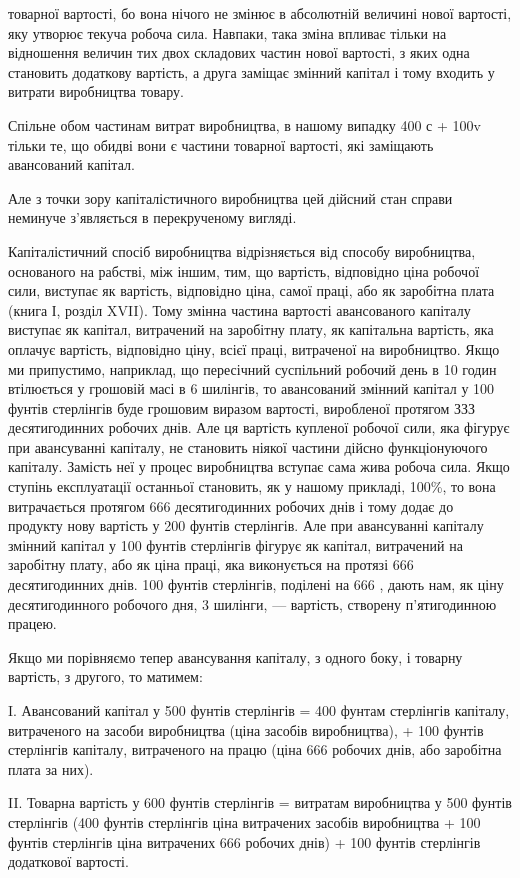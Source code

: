 \parcont{}  %
товарної вартості, бо вона нічого не змінює в абсолютній величині
нової вартості, яку утворює текуча робоча сила. Навпаки,
така зміна впливає тільки на відношення величин тих двох складових
частин нової вартості, з яких одна становить додаткову
вартість, а друга заміщає змінний капітал і тому входить у витрати
виробництва товару.

Спільне обом частинам витрат виробництва, в нашому випадку
400 с + 100v тільки те, що обидві вони є частини товарної
вартості, які заміщають авансований капітал.

Але з точки зору капіталістичного виробництва цей дійсний
стан справи неминуче з’являється в перекрученому вигляді.

Капіталістичний спосіб виробництва відрізняється від способу
виробництва, основаного на рабстві, між іншим, тим, що
вартість, відповідно ціна робочої сили, виступає як вартість,
відповідно ціна, самої праці, або як заробітна плата (книга І,
розділ XVII). Тому змінна частина вартості авансованого капіталу
виступає як капітал, витрачений на заробітну плату,
як капітальна вартість, яка оплачує вартість, відповідно ціну,
всієї праці, витраченої на виробництво. Якщо ми припустимо,
наприклад, що пересічний суспільний робочий день в 10 годин
втілюється у грошовій масі в 6 шилінгів, то авансований
змінний капітал у 100 фунтів стерлінгів буде грошовим
виразом вартості, виробленої протягом ЗЗЗ  десятигодинних
робочих днів. Але ця вартість купленої робочої сили, яка фігурує
при авансуванні капіталу, не становить ніякої частини
дійсно функціонуючого капіталу. Замість неї у процес виробництва
вступає сама жива робоча сила. Якщо ступінь експлуатації
останньої становить, як у нашому прикладі, 100\%, то вона
витрачається протягом 666  десятигодинних робочих днів і тому
додає до продукту нову вартість у 200 фунтів стерлінгів. Але
при авансуванні капіталу змінний капітал у 100 фунтів стерлінгів
фігурує як капітал, витрачений на заробітну плату, або як
ціна праці, яка виконується на протязі 666   десятигодинних
днів. 100 фунтів стерлінгів, поділені на 666  , дають нам, як
ціну десятигодинного робочого дня, 3 шилінги, — вартість, створену
п’ятигодинною працею.

Якщо ми порівняємо тепер авансування капіталу, з одного
боку, і товарну вартість, з другого, то матимем:

I. Авансований капітал у 500 фунтів стерлінгів = 400 фунтам
стерлінгів капіталу, витраченого на засоби виробництва
(ціна засобів виробництва), + 100 фунтів стерлінгів капіталу,
витраченого на працю (ціна 666   робочих днів, або заробітна
плата за них).

II. Товарна вартість у 600 фунтів стерлінгів = витратам виробництва
у 500 фунтів стерлінгів (400 фунтів стерлінгів
ціна витрачених засобів виробництва + 100 фунтів стерлінгів
ціна витрачених 666   робочих днів) + 100 фунтів
стерлінгів додаткової вартості.

